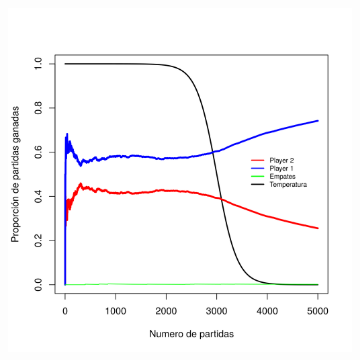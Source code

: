 \documentclass[shownotes]{beamer}
\begin{document}
\begin{frame}{}


\begin{figure}[H]
    \centering
    \begin{subfigure}[b]{0.45\textwidth}
      \includegraphics[width=\textwidth]{../Imagenes/SinVision_disipacion_QsinVison}
    \end{subfigure}
\end{figure}

\end{frame}
\end{document}
